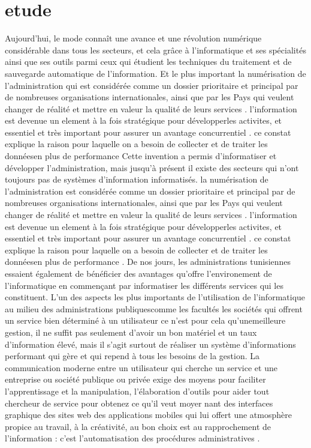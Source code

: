\documentclass{article}
\begin{document}
\section{etude }

Aujourd'hui, le mode connaît une avance et une révolution numérique considérable dans tous les secteurs, et cela grâce à l’informatique et ses spécialités ainsi que ses outils parmi ceux qui étudient les techniques du traitement et de sauvegarde automatique de l’information. Et le plus important la numérisation de l'administration qui est considérée comme un dossier prioritaire et principal par de nombreuses organisations internationales, ainsi que par les Pays qui veulent changer de réalité et mettre en valeur la qualité de leurs services . l’information est devenue un element à la fois stratégique pour développerles activites, et essentiel et très important pour assurer un avantage concurrentiel . ce constat explique la raison pour laquelle on a besoin de collecter et de traiter les donnéesen plus de performance 
Cette invention a permis d’informatiser et développer l'administration, mais jusqu'à présent il existe des secteurs qui n’ont toujours pas de systèmes d’information informatisés. la numérisation de l'administration est considérée comme un dossier prioritaire et principal par de nombreuses organisations internationales, ainsi que par les Pays qui veulent changer de réalité et mettre en valeur la qualité de leurs services . l’information est devenue un element à la fois stratégique pour développerles activites, et essentiel et très important pour assurer un avantage concurrentiel . ce constat explique la raison pour laquelle on a besoin de collecter et de traiter les donnéesen plus de performance .
De nos jours, les administrations tunisiennes essaient également de bénéficier des avantages qu’offre l’environement de l’informatique en commençant par informatiser les différents services qui les constituent. L’un des aspects les plus importants de l’utilisation de l’informatique au milieu des administrations publiquescomme les facultés les sociétés qui offrent un service bien déterminé à un utilisateur ce n'est pour cela qu'unemeilleure gestion, il ne suffit pas seulement d’avoir un bon matériel et un taux d’information élevé, mais il s’agit surtout de réaliser un système d’informations performant qui gère et qui repend à tous les besoins de la gestion.
La communication moderne entre un utilisateur qui cherche un service et une entreprise ou société publique ou privée exige des moyens pour faciliter l'apprentissage et la manipulation, l’élaboration d'outils pour aider tout chercheur de service pour obtenez ce qu'il veut moyer nant des interfaces graphique des sites web des applications mobiles qui lui offert une atmosphère propice au travail, à la créativité, au bon choix est au rapprochement de l'information : c’est l'automatisation des procédures administratives .
\end{document}
